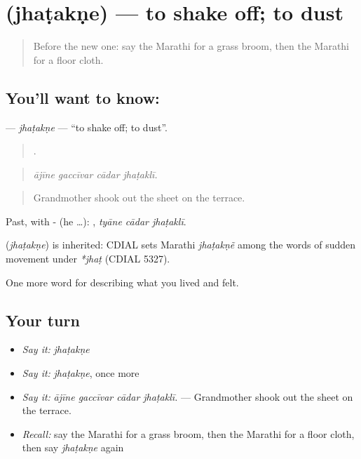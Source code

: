 \section[\texorpdfstring{\mr{झटकणे} (jhaṭakṇe)}{झटकणे (jhaṭakṇe)}]{ (jhaṭakṇe) — to shake off; to dust}

\label{lesson:MR-C524-jhatakne}



\begin{quote}
Before the new one: say the Marathi for a grass broom, then the Marathi for a floor cloth.
\end{quote}

\subsection*{You'll want to know: }
\textbf{} — \emph{jhaṭakṇe} — \textquotedblleft{}to shake off; to dust\textquotedblright{}.

\begin{quote}
   .
\end{quote}

\begin{quote}
\emph{ājīne gaccīvar cādar jhaṭaklī.}
\end{quote}

\begin{quote}
Grandmother shook out the sheet on the terrace.
\end{quote}

Past, with - (he …):   , \emph{tyāne cādar jhaṭaklī}.

\begin{cousinweb}
\textbf{} (\emph{jhaṭakṇe}) is inherited: CDIAL sets Marathi \emph{jhaṭakṇẽ} among the words of sudden movement under \emph{*jhaṭ} (CDIAL 5327).
\end{cousinweb}

\begin{grammarlens}[title={What you've built}]
One more word for describing what you lived and felt.
\end{grammarlens}

\subsection*{Your turn}
\begin{itemize}
\raggedright
  \item \emph{Say it:} \emph{jhaṭakṇe}
  \item \emph{Say it:} \emph{jhaṭakṇe}, once more
  \item \emph{Say it:} \emph{ājīne gaccīvar cādar jhaṭaklī.} — Grandmother shook out the sheet on the terrace.
  \item \emph{Recall:} say the Marathi for a grass broom, then the Marathi for a floor cloth, then say \emph{jhaṭakṇe} again
\end{itemize}

